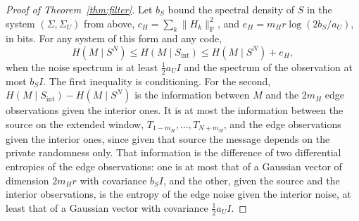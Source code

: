 \documentclass[11pt,onecolumn]{IEEEtran}
\begin{document}
\begin{proof}[Proof of Theorem~\ref{thm:filter}]
Let $b_S$ bound the spectral density of $S$ in the system
$(\Sigma,\Sigma_U)$ from above,
$c_H=\sum_k\|H_k\|_{\mathrm F}^2$, and
$e_H=m_Hr\log(2b_S/a_U)$, in bits. For any system of this
form and any code,
\begin{equation}
H(M\mid S^N)\le H(M\mid S_{\mathrm{int}})\le H(M\mid S^N)+e_H ,
\label{eq:edges}
\end{equation}
when the noise spectrum is at least $\tfrac12a_UI$ and the spectrum of
the observation at most $b_S I$. The first inequality is conditioning.
For the second, $H(M\mid S_{\mathrm{int}})-H(M\mid S^N)$ is the
information between $M$ and the $2m_H$ edge observations given the
interior ones. It is at most the information between the source on the extended
window, $T_{1-m_H},\dots,T_{N+m_H}$, and the edge observations given the
interior ones, since given that source the message depends on the
private randomness only. That information is the difference
of two differential entropies of the edge observations: one is at most
that of a Gaussian vector of dimension $2m_Hr$ with covariance $b_SI$,
and the other, given the source and the interior observations, is the
entropy of the edge noise given the interior noise, at least that of a
Gaussian vector with covariance $\tfrac12a_UI$.


\end{proof}
\end{document}
